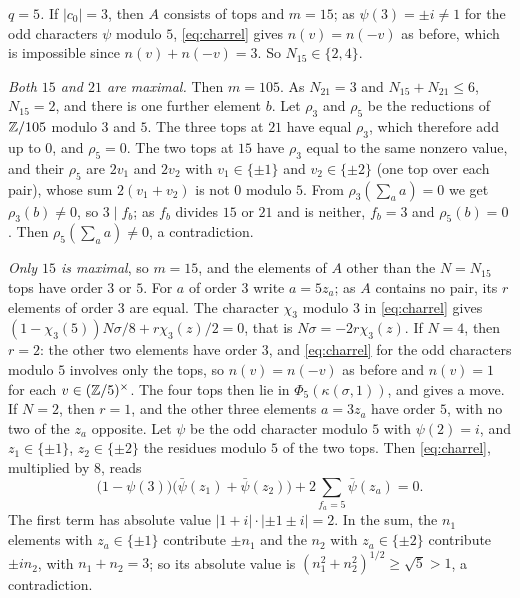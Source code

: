 \emph{$q=5$.} If $|c_{0}|=3$, then $A$ consists of tops and $m=15$; as
$\psi(3)=\pm i\ne1$ for the odd characters $\psi$ modulo $5$,
\eqref{eq:charrel} gives $n(v)=n(-v)$ as before, which is impossible since
$n(v)+n(-v)=3$. So $N_{15}\in\{2,4\}$.

\emph{Both $15$ and $21$ are maximal.} Then $m=105$. As $N_{21}=3$ and
$N_{15}+N_{21}\le6$, $N_{15}=2$, and there is one further element $b$. Let
$\rho_{3}$ and $\rho_{5}$ be the reductions of $\mathbb{Z}/105$ modulo $3$ and $5$.
The three tops at $21$ have equal $\rho_{3}$, which therefore add up to $0$,
and $\rho_{5}=0$. The two tops at $15$ have $\rho_{3}$ equal to the same
nonzero value, and their $\rho_{5}$ are $2v_{1}$ and $2v_{2}$ with $v_{1}\in\{\pm1\}$ and
$v_{2}\in\{\pm2\}$ (one top over each pair), whose sum $2(v_{1}+v_{2})$ is
not $0$ modulo $5$. From $\rho_{3}(\sum_{a}a)=0$ we get $\rho_{3}(b)\ne0$,
so $3\mid f_{b}$; as $f_{b}$ divides $15$ or $21$ and is neither, $f_{b}=3$
and $\rho_{5}(b)=0$. Then $\rho_{5}(\sum_{a}a)\ne0$, a contradiction.

\emph{Only $15$ is maximal}, so $m=15$, and the elements of $A$ other than
the $N=N_{15}$ tops have order $3$ or $5$. For $a$ of order $3$ write
$a=5z_{a}$; as $A$ contains no pair, its $r$ elements of order $3$ are
equal. The character $\chi_{3}$ modulo $3$ in \eqref{eq:charrel} gives
$(1-\chi_{3}(5))N\sigma/8+r\chi_{3}(z)/2=0$, that is $N\sigma=-2r\chi_{3}(z)$.
If $N=4$, then $r=2$: the other two elements have order $3$, and
\eqref{eq:charrel} for the odd characters modulo $5$ involves only the tops,
so $n(v)=n(-v)$ as before and $n(v)=1$ for each $v\in(\mathbb{Z}/5)^{\times}$. The
four tops then lie in $\Phi_{5}(\kappa(\sigma,1))$, and 
gives a move. If $N=2$, then $r=1$, and the other three elements $a=3z_{a}$
have order $5$, with no two of the $z_{a}$ opposite. Let $\psi$ be the odd
character modulo $5$ with $\psi(2)=i$, and $z_{1}\in\{\pm1\}$, $z_{2}\in
\{\pm2\}$ the residues modulo $5$ of the two tops. Then \eqref{eq:charrel},
multiplied by $8$, reads
\[
  \bigl(1-\psi(3)\bigr)\bigl(\bar\psi(z_{1})+\bar\psi(z_{2})\bigr)
  +2\sum_{f_{a}=5}\bar\psi(z_{a})=0.
\]
The first term has absolute value $|1+i|\cdot|{\pm1}\pm i|=2$. In the sum, the
$n_{1}$ elements with $z_{a}\in\{\pm1\}$ contribute $\pm n_{1}$ and the
$n_{2}$ with $z_{a}\in\{\pm2\}$ contribute $\pm in_{2}$, with
$n_{1}+n_{2}=3$; so its absolute value is $(n_{1}^{2}+n_{2}^{2})^{1/2}\ge
\sqrt5>1$, a contradiction.

